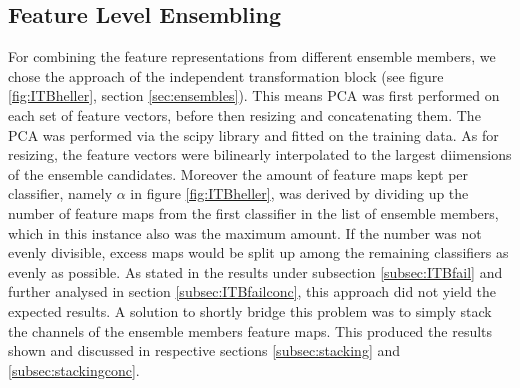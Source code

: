 \subsection{Feature Level Ensembling}
\label{sec:featurelevelensemble}

For combining the feature representations from different ensemble members, we chose the approach of the independent transformation block (see figure \ref{fig:ITBheller}, section \ref{sec:ensembles}). This means 
PCA was first performed on each set of feature vectors, before then resizing and concatenating them. The PCA was performed via the scipy library and fitted on the training data. As for resizing, 
the feature vectors were bilinearly interpolated to the largest diimensions of the ensemble candidates. Moreover the amount of feature maps kept per classifier, namely $\alpha$ in figure \ref{fig:ITBheller}, 
was derived by dividing up the number of feature maps from the first classifier in the list of ensemble members, which in this instance also was the maximum amount. If the number 
was not evenly divisible, excess maps would be split up among the remaining classifiers as evenly as possible.\newline
As stated in the results under subsection \ref{subsec:ITBfail} and further analysed in section \ref{subsec:ITBfailconc}, this approach did not yield the expected results. 
A solution to shortly bridge this problem was to simply stack the channels of the ensemble members feature maps. This produced the results shown and discussed in respective 
sections \ref{subsec:stacking} and \ref{subsec:stackingconc}.


